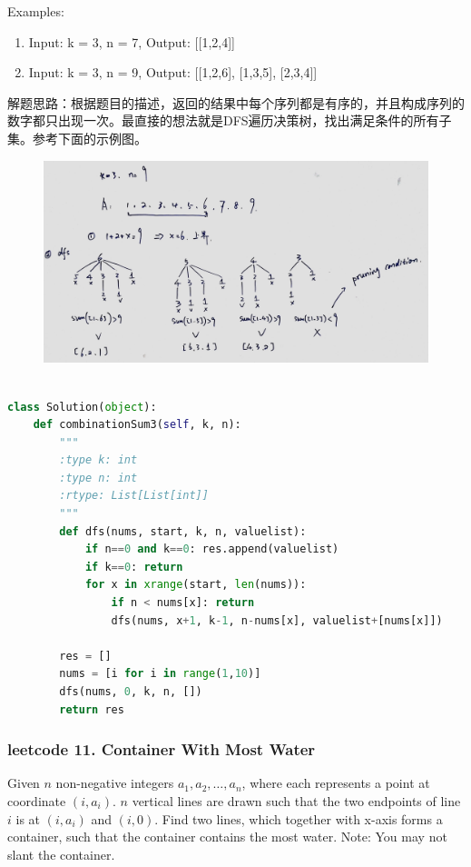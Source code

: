 \documentclass[a4paper,10pt]{article}
\begin{document}
\noindent Examples:
\begin{enumerate}
    \item Input: k = 3, n = 7, Output: [[1,2,4]]
    \item Input: k = 3, n = 9, Output: [[1,2,6], [1,3,5], [2,3,4]]
\end{enumerate}

\begin{CJK*}{UTF8}{gbsn}
\noindent 解题思路：根据题目的描述，返回的结果中每个序列都是有序的，并且构成序列的数字都只出现一次。最直接的想法就是DFS遍历决策树，找出满足条件的所有子集。参考下面的示例图。
\end{CJK*}

\begin{figure}[h]
    \includegraphics[width=\textwidth]{leetcode216.jpg}
    \centering \\
\end{figure}

\begin{lstlisting}[language=Python, caption=Problem216. Combination Sum III]

class Solution(object):
    def combinationSum3(self, k, n):
        """
        :type k: int
        :type n: int
        :rtype: List[List[int]]
        """
        def dfs(nums, start, k, n, valuelist):
            if n==0 and k==0: res.append(valuelist)
            if k==0: return
            for x in xrange(start, len(nums)):
                if n < nums[x]: return
                dfs(nums, x+1, k-1, n-nums[x], valuelist+[nums[x]])
        
        res = []
        nums = [i for i in range(1,10)]
        dfs(nums, 0, k, n, [])
        return res
\end{lstlisting}


\subsubsection{leetcode 11. Container With Most Water}
Given $n$ non-negative integers $a_1, a_2, \dots, a_n$, where each represents a point at coordinate $(i, a_i)$. $n$ vertical lines are drawn such that the two endpoints of line $i$ is at $(i, a_i)$ and $(i, 0)$. Find two lines, which together with x-axis forms a container, such that the container contains the most water. Note: You may not slant the container. \\
\end{document}
